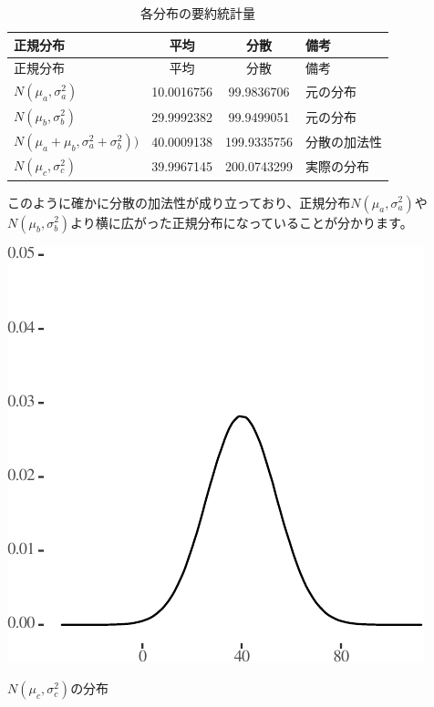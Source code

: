 \documentclass[]{tufte-handout}
\begin{document}
\begin{longtable}[]{@{}lccl@{}}
\caption{各分布の要約統計量}\tabularnewline
\toprule
正規分布 & 平均 & 分散 & 備考 \\
\midrule
\endfirsthead
\toprule
正規分布 & 平均 & 分散 & 備考 \\
\midrule
\endhead
\(N(\mu_a, \sigma^2_a)\) & 10.0016756 & 99.9836706 & 元の分布 \\
\(N(\mu_b, \sigma^2_b)\) & 29.9992382 & 99.9499051 & 元の分布 \\
\(N(\mu_a + \mu_b, \sigma^2_a + \sigma^2_b))\) & 40.0009138 &
199.9335756 & 分散の加法性 \\
\(N(\mu_c, \sigma^2_c)\) & 39.9967145 & 200.0743299 & 実際の分布 \\
\bottomrule
\end{longtable}

このように確かに分散の加法性が成り立っており、正規分布\(N(\mu_a, \sigma^2_a)\)や\(N(\mu_b,\sigma^2_b)\)より横に広がった正規分布になっていることが分かります。

\begin{marginfigure}

{\centering \includegraphics{AdditivityOfVariance_files/figure-latex/unnamed-chunk-5-1} 

}

\caption[$N(\mu_c, \sigma^2_c)$の分布]{$N(\mu_c, \sigma^2_c)$の分布}\label{fig:unnamed-chunk-5}
\end{marginfigure}
\end{document}
